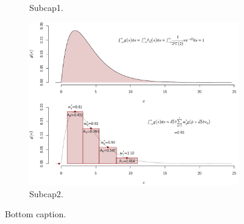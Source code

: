 \documentclass{article}
\begin{document}
\begin{figure}[h!] 
\centering
\begin{subfigure}[b]{0.2\textwidth}
\centering
	\caption{Subcap1. } \label{fig:sf1}
\end{subfigure}
\begin{subfigure}[b]{0.79\textwidth}
\centering 
		\includegraphics[width=1\textwidth]{fig/g-int-example.pdf}
	\caption{Subcap2. } \label{fig:sf2}
\end{subfigure}
\caption{Bottom caption.} \label{fig:two}
\end{figure}
\end{document}

